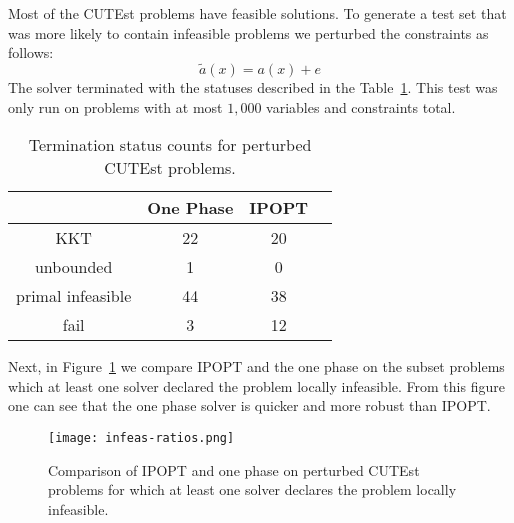 \documentclass{article}
\begin{document}
Most of the CUTEst problems have feasible solutions. To generate a test set that was more likely to contain infeasible problems we perturbed the constraints as follows:
$$
\tilde{a}(x) = a(x) + e
$$
The solver terminated with the statuses described in the Table~\ref{tbl:termination-status-counts-peturbed}. This test was only run on problems with at most $1,000$ variables and constraints total.
\begin{table}[H]
\caption{Termination status counts for perturbed CUTEst problems.}\label{tbl:termination-status-counts-peturbed}
\begin{tabular}{ c c c r }
 &  One Phase &  IPOPT &  \\
  \hline
KKT & 22 & 20 \\
unbounded & 1 & 0  \\
primal infeasible & 44 &  38 \\
fail & 3 & 12 \\
\end{tabular}
\end{table}

Next, in Figure~\ref{fig:comparison-IPOPT-on-perturbed-CUTEst} we compare IPOPT and the one phase on the subset problems which at least one solver declared the problem locally infeasible. From this figure one can see that the one phase solver is quicker and more robust than IPOPT.

\begin{figure}[H]
\texttt{[image: infeas-ratios.png]}
\caption{Comparison of IPOPT and one phase on perturbed CUTEst problems for which at least one solver declares the problem locally infeasible.}\label{fig:comparison-IPOPT-on-perturbed-CUTEst}
\end{figure}

%
%
%
%
\end{document}
